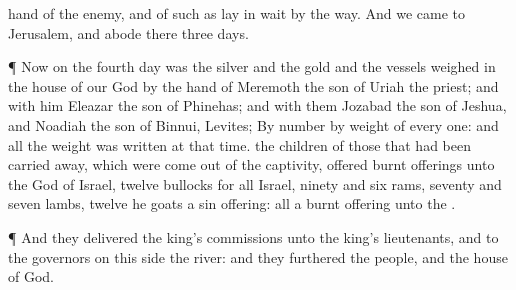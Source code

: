 {hand of the
enemy, and of such as lay in
wait by the
way.
And we
came to
Jerusalem, and
abode there
three
days.
\par }{\PP {}¶ Now on the
fourth
day was the
silver and the
gold and the
vessels
weighed in the
house of our
God by the
hand of
Meremoth the
son of
Uriah the
priest; and with him
{}
Eleazar the
son of
Phinehas; and with them
{}
Jozabad the
son of
Jeshua, and
Noadiah the
son of
Binnui,
Levites;
By
number
{} by
weight of every one: and all the
weight was
written at that
time.
 the
children of those that had been carried
away, which were come
out of the
captivity,
offered burnt
offerings unto the
God of
Israel,
twelve
bullocks for all
Israel,
ninety and
six
rams,
seventy and
seven
lambs,
twelve he
goats
{} a sin
offering: all
{} a burnt
offering unto the
{}.
\par }{\PP {}¶ And they
delivered the
king’s
commissions unto the
king’s
lieutenants, and to the
governors on this
side the
river: and they
furthered the
people, and the
house of
God.

}

